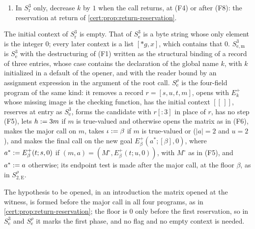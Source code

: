 \begin{definition}
\begin{enumerate}[label=(F\arabic*)]
\item In $S^{3}_{\mathrm r}$ only, decrease $k$ by $1$ when the call returns, at (F4)
or after (F8): the reservation at return of \cref{cert:prop:return-reservation}.
\end{enumerate}
The initial context of $S^{3}_{\mathrm r}$ is empty. That of $S^{3}_{\mathrm e}$ is a
byte string whose only element is the integer $0$; every later context is a list
$[{*}g,x]$, which contains that $0$. $S^{3}_{\mathrm{e,m}}$ is $S^{3}_{\mathrm e}$
with the destructuring of (F1) written as the structural binding of a record of
three entries, whose case contains the declaration of the global name $k$, with $k$
initialized in a default of the opener, and with the reader bound by an assignment
expression in the argument of the root call. $S^{\rho}_{\mathrm e}$ is the four-field
program of the same kind: it removes a record $r=[s,u,t,m]$, opens with $E^{+}_k$
whose missing image is the checking function, has the initial context $[[\,]]$,
reserves at entry as $S^{3}_{\mathrm e}$, forms the candidate with $r[{:}3]$ in place
of $r$, has no step (F5), lets $h\mathrel{:=} 3m$ if $m$ is true-valued and otherwise opens
the matrix as in (F6), makes the major call on $m$, takes $\iota\mathrel{:=}\beta$ if $m$
is true-valued or ($\lvert a\rvert=2$ and $u=2$), and makes the final call on the new
goal $E^{+}_{\beta}(a^{*};[\beta],0)$, where $a^{*}\mathrel{:=} E^{+}_{\beta}(t;s,0)$ if
$(m,a)=(M^{\circ},E^{+}_{\beta}(t;u,0))$, with $M^{\circ}$ as in (F5), and
$a^{*}\mathrel{:=} a$ otherwise; its endpoint test is made after the major call, at the
floor $\beta$, as in $S^{\rho}_{2,\mathrm E}$.
\end{definition}

The hypothesis to be opened, in an introduction the matrix opened at the witness, is
formed before the major call in all four programs, as in
\cref{cert:prop:return-reservation}; the floor is $0$ only before the first
reservation, so in $S^{3}_{\mathrm e}$ and $S^{\rho}_{\mathrm e}$ it marks the first
phase, and no flag and no empty context is needed.

